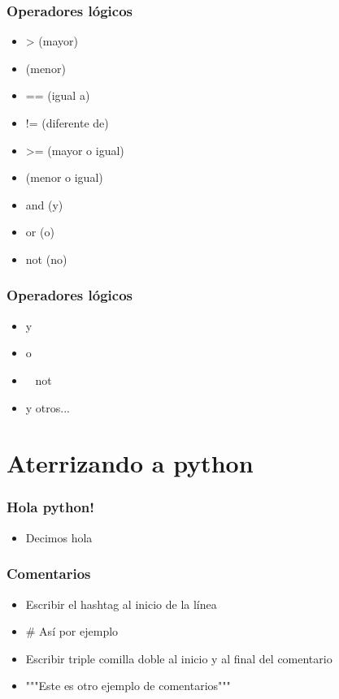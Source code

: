 \documentclass[hyperref={pdfpagelabels=false},xcolor=pst,pdf,fragile]{beamer}
\begin{document}
\begin{frame}
    \frametitle{Operadores lógicos}
    \pause
    \begin{itemize}
    \item > (mayor)
    \item  (menor)
    \item == (igual a)
    \item != (diferente de)
    \item >= (mayor o igual)
    \item  (menor o igual)
    \item and (y)
    \item or (o)
    \item not (no)
    \end{itemize}
\end{frame}

\begin{frame}
    \frametitle{Operadores lógicos}
    \begin{itemize}
    \item  y
    \item  o
    \item ~ not
    \item y otros...
    \end{itemize}
\end{frame}

\section{Aterrizando a python}
\begin{frame}
    \frametitle{Hola python!}
    \pause
    \begin{itemize}
    \item Decimos hola
    \end{itemize}
\end{frame}


\begin{frame}
    \frametitle{Comentarios}
    \pause
    \begin{itemize}
    \item Escribir el hashtag al inicio de la línea
    \item # Así por ejemplo
    \item Escribir triple comilla doble al inicio y al final del comentario
    \item """Este es otro ejemplo de comentarios"""
    \end{itemize}
\end{frame}
\end{document}
